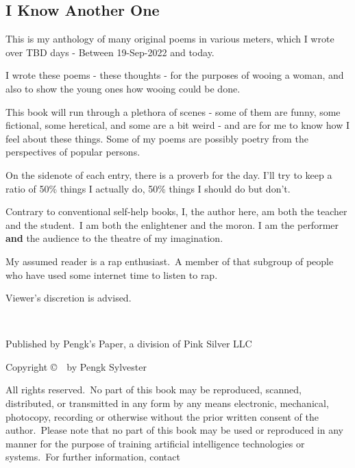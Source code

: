 \begin{fullwidth}

\section{I Know Another One}

\setlength{\parindent}{0pt}
\setlength{\parskip}{\baselineskip}

This is my anthology of many original poems in various meters, %
which I wrote over TBD days - Between 19-Sep-2022 and today. %


I wrote these poems - these thoughts - for the purposes of wooing a woman, %
and also to show the young ones how wooing could be done.


This book will run through a plethora of scenes - some of them are funny, some fictional, %
some heretical, and some are a bit weird - and are for me to know how I feel about these things.
Some of my poems are possibly poetry from the perspectives of popular persons.


On the sidenote of each entry, there is a proverb for the day. %
I'll try to keep a ratio of 50\% things I actually do, 50\% things I should do but don't.


Contrary to conventional self-help books, I, the author here, am both the teacher %
and the student.\ I am both the enlightener and the moron.
I am the performer \textbf{and} the audience to the theatre of my imagination.


My assumed reader is a rap enthusiast.\ A member of that subgroup of people who have used some internet time to listen to rap.


Viewer's discretion is advised.

~\vfill

Published by Pengk's Paper, a division of Pink Silver LLC

Copyright \copyright\ \the\year\ by Pengk Sylvester

\par All rights reserved.\ No part of this book may be reproduced, scanned, distributed, or transmitted in any form by
any means electronic, mechanical, photocopy, recording or otherwise without the prior written consent of the author.\ Please note that no part of this book may be used or reproduced in any manner for the purpose of training artificial intelligence technologies or systems.\ For further information, contact 


\end{fullwidth}
